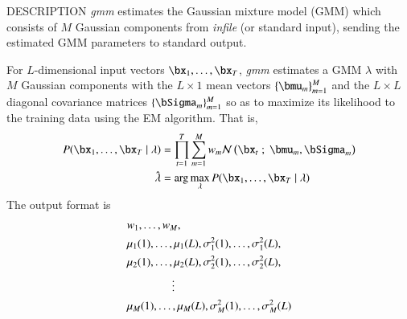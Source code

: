 \begin{synopsis}
\item[gmm] [ --l $L$ ] [ --m $M$ ] [ --t $T$ ] [ --a A ] [ --b N ]
           [ --e $E$ ] [ --v $V$ ] [ --w $W$ ] [ {\em infile} ]
\end{synopsis}

\begin{qsection}{DESCRIPTION}
{\em gmm} estimates the Gaussian mixture model (GMM) which consists of $M$ Gaussian components 
from {\em infile} (or standard input), sending the estimated GMM parameters to standard output.

For $L$-dimensional input vectors $\bx_1, \dots, \bx_T$,
{\em gmm} estimates a GMM $\lambda$ with $M$ Gaussian components with the $L \times 1$ mean vectors 
$\{ \bmu_m \}_{m=1}^M$ and the $L\times L$ diagonal covariance matrices $\{ \bSigma_m \}_{m=1}^M$
so as to maximize its likelihood to the training data using the EM algorithm. 
That is, 
\begin{align}
   P( \bx_1, \dots, \bx_T \mid \lambda ) &= \prod_{t=1}^{T} 
   \sum_{m=1}^{M} w_m \mathcal{N} \left( \bx_t \; ; \; \bmu_m, \bSigma_m \right) \notag \\
   \hat{\lambda} &= \arg \max_\lambda P( \bx_1, \dots, \bx_T \mid \lambda ) \notag
\end{align}
The output format is 
\begin{align}
    & w_1, \dots, w_M, \notag\\
    & \mu_1(1), \dots, \mu_1(L),
      \sigma^2_1(1), \dots, \sigma^2_1(L), \notag \\
    & \mu_2(1), \dots, \mu_2(L),
      \sigma^2_2(1), \dots, \sigma^2_2(L), \notag \\
    & 
      \qquad \qquad \vdots \notag \\
    & \mu_M(1), \dots, \mu_M(L),
      \sigma^2_M(1), \dots, \sigma^2_M(L) \notag
 \end{align}
\end{qsection}

\begin{options}
\end{options}

